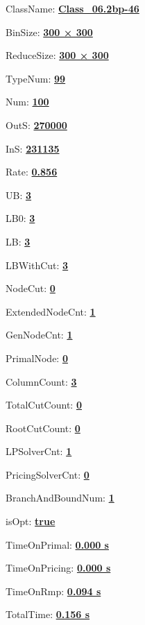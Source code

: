 \documentclass[11pt]{article}
\begin{document}
\pagestyle{empty}


ClassName: \underline{\textbf{Class_06.2bp-46}}
\par
BinSize: \underline{\textbf{300 × 300}}
\par
ReduceSize: \underline{\textbf{300 × 300}}
\par
TypeNum: \underline{\textbf{99}}
\par
Num: \underline{\textbf{100}}
\par
OutS: \underline{\textbf{270000}}
\par
InS: \underline{\textbf{231135}}
\par
Rate: \underline{\textbf{0.856}}
\par
UB: \underline{\textbf{3}}
\par
LB0: \underline{\textbf{3}}
\par
LB: \underline{\textbf{3}}
\par
LBWithCut: \underline{\textbf{3}}
\par
NodeCut: \underline{\textbf{0}}
\par
ExtendedNodeCnt: \underline{\textbf{1}}
\par
GenNodeCnt: \underline{\textbf{1}}
\par
PrimalNode: \underline{\textbf{0}}
\par
ColumnCount: \underline{\textbf{3}}
\par
TotalCutCount: \underline{\textbf{0}}
\par
RootCutCount: \underline{\textbf{0}}
\par
LPSolverCnt: \underline{\textbf{1}}
\par
PricingSolverCnt: \underline{\textbf{0}}
\par
BranchAndBoundNum: \underline{\textbf{1}}
\par
isOpt: \underline{\textbf{true}}
\par
TimeOnPrimal: \underline{\textbf{0.000 s}}
\par
TimeOnPricing: \underline{\textbf{0.000 s}}
\par
TimeOnRmp: \underline{\textbf{0.094 s}}
\par
TotalTime: \underline{\textbf{0.156 s}}
\par
\newpage
\end{document}
